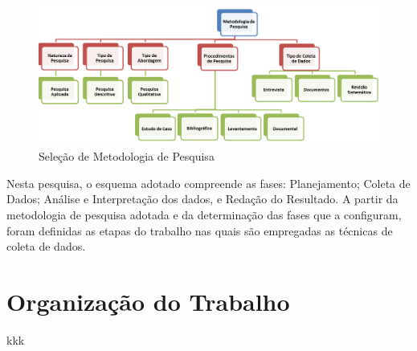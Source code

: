 	\begin{figure}[h]
		\centering
		\label{fig01}
			\includegraphics[scale=0.4]{figuras/metodologiapesquisa.png}
		\caption{Seleção de Metodologia de Pesquisa}
	\end{figure}

Nesta pesquisa, o esquema adotado compreende as fases: Planejamento; Coleta
de Dados; Análise e Interpretação dos dados, e Redação do Resultado. A partir da
metodologia de pesquisa adotada e da determinação das fases que a configuram,
foram definidas as etapas do trabalho nas quais são empregadas as técnicas de coleta
de dados.

\section[Organização do Trabalho]{Organização do Trabalho}
kkk